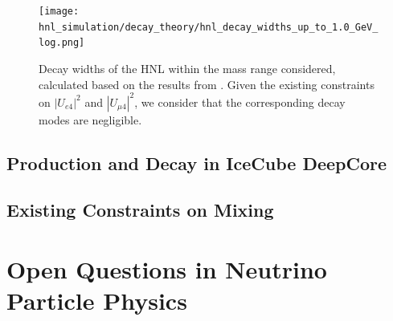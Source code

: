 \begin{figure}
    \texttt{[image: hnl\_simulation/decay\_theory/hnl\_decay\_widths\_up\_to\_1.0\_GeV\_log.png]}
    \caption{Decay widths of the HNL within the mass range considered, calculated based on the results from \cite{Coloma:2020lgy}. Given the existing constraints on $|U_{e4}|^{2}$ and $|U_{\mu4}|^{2}$, we consider that the corresponding decay modes are negligible.}
\end{figure}


\subsection{Production and Decay in IceCube DeepCore} 


\subsection{Existing Constraints on Mixing} 


\section{Open Questions in Neutrino Particle Physics}
